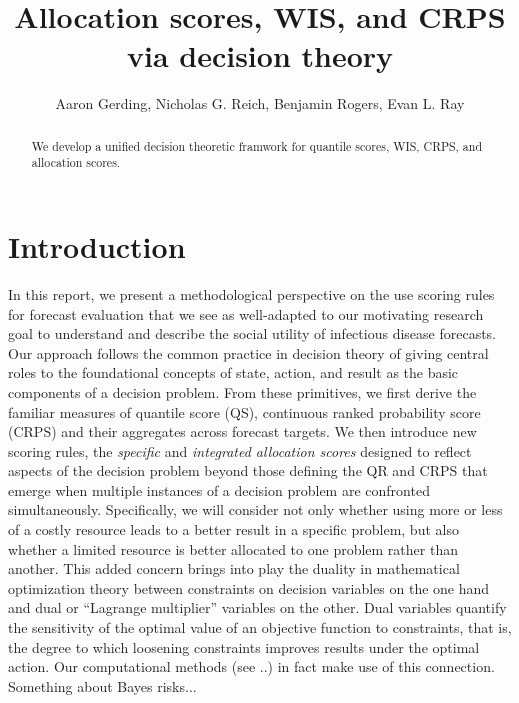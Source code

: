 \documentclass{article}
\title{Allocation scores, WIS, and CRPS via decision theory}
\author{Aaron Gerding, Nicholas G. Reich, Benjamin Rogers, Evan L. Ray}
\begin{document}
\newcommand{\del}[2]{\frac{\partial {#1} }{\partial {#2}} }
\newcommand{\dby}[2]{\frac{d {#1} }{d {#2}} }
\newcommand{\sbar}{\overline{s}}
\newtheorem{proposition}{Proposition}

\theoremstyle{remark}
\newtheorem*{remark}{Remark}

\maketitle

\begin{abstract}

We develop a unified decision theoretic framwork for quantile scores, WIS, CRPS, and allocation scores.

\end{abstract}

\section{Introduction}

In this report, we present a methodological perspective on the use scoring rules for forecast evaluation that we see as well-adapted to our motivating research goal to understand and describe the social utility of infectious disease forecasts. Our approach follows the common practice in decision theory of giving central roles to the foundational concepts of state, action, and result as the basic components of a decision problem. From these primitives, we first derive the familiar measures of quantile score (QS), continuous ranked probability score (CRPS) and their aggregates across forecast targets.  We then introduce new scoring rules, the \emph{specific} and \emph{integrated allocation scores} designed to reflect aspects of the decision problem beyond those defining the QR and CRPS that emerge when multiple instances of a decision problem are confronted simultaneously.  Specifically, we will consider not only whether using more or less of a costly resource leads to a better result in a specific problem, but also whether a limited resource is better allocated to one problem rather than another.
This added concern brings into play the duality in mathematical optimization theory between constraints on decision variables on the one hand and dual or ``Lagrange multiplier'' variables on the other.  Dual variables quantify the sensitivity of the optimal value of an objective function to constraints, that is, the degree to which loosening constraints improves results under the optimal action.
Our computational methods (see ..) in fact make use of this connection.
Something about Bayes risks...
\end{document}
